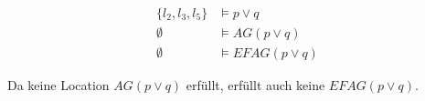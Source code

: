 
\begin{align*}
\{l_2, l_3, l_5\} &\vDash p \vee q \\
\emptyset &\vDash AG(p \vee q) \\
\emptyset &\vDash EFAG(p \vee q)
\end{align*}

Da keine Location $AG(p\vee q)$ erfüllt, erfüllt auch keine $EFAG(p\vee q)$.